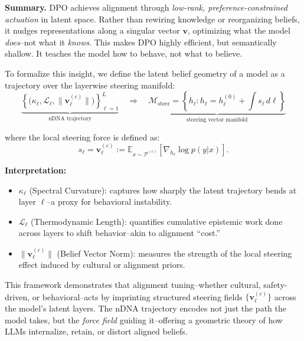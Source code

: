 \vspace{1mm}
\textbf{Summary.} DPO achieves alignment through \emph{low-rank, preference-constrained actuation} in latent space. Rather than rewiring knowledge or reorganizing beliefs, it nudges representations along a singular vector \( \mathbf{v} \), optimizing what the model \emph{does}--not what it \emph{knows}. This makes DPO highly efficient, but semantically shallow. It teaches the model how to behave, not what to believe.

\vspace{1mm}
To formalize this insight, we define the latent belief geometry of a model as a trajectory over the layerwise steering manifold:
\[
\boxed{
\underbrace{
\left\{
\big( \kappa_\ell, \mathcal{L}_\ell, \| \mathbf{v}_\ell^{(c)} \| \big)
\right\}_{\ell=1}^{L}
}_{\text{nDNA trajectory}}
\quad \Rightarrow \quad
\underbrace{
\mathcal{M}_{\mathrm{steer}} =
\left\{
h_\ell :
h_\ell = h_\ell^{(0)} + \int s_\ell \, d\ell
\right\}
}_{\text{steering vector manifold}}
}
\]

where the local steering force is defined as:
\[
s_\ell = \mathbf{v}_\ell^{(c)} := 
\mathbb{E}_{x \sim \mathcal{P}^{(c)}}
\left[
\nabla_{h_\ell} \log p(y|x)
\right].
\]

\noindent\textbf{Interpretation:}
\begin{itemize}[leftmargin=1.5em]
    \item \( \kappa_\ell \) (Spectral Curvature): captures how sharply the latent trajectory bends at layer \( \ell \)--a proxy for behavioral instability.
    \item \( \mathcal{L}_\ell \) (Thermodynamic Length): quantifies cumulative epistemic work done across layers to shift behavior--akin to alignment “cost.”
    \item \( \| \mathbf{v}_\ell^{(c)} \| \) (Belief Vector Norm): measures the strength of the local steering effect induced by cultural or alignment priors.
\end{itemize}

This framework demonstrates that alignment tuning--whether cultural, safety-driven, or behavioral--acts by imprinting structured steering fields \( \{ \mathbf{v}_\ell^{(c)} \} \) across the model’s latent layers. The nDNA trajectory encodes not just the path the model takes, but the \emph{force field} guiding it--offering a geometric theory of how LLMs internalize, retain, or distort aligned beliefs.



